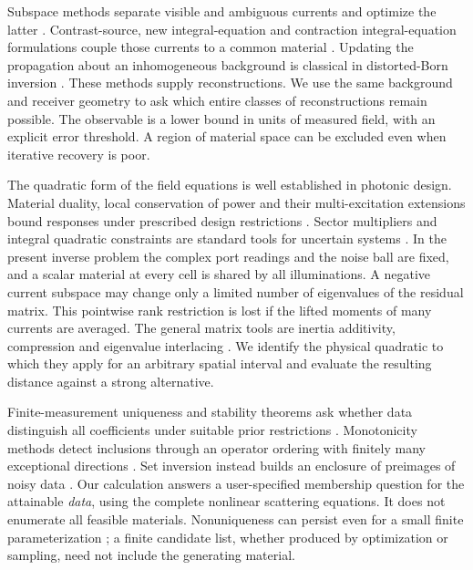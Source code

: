 \documentclass[anonymous,12pt]{iopjournal}
\numberwithin{equation}{section}
\begin{document}
Subspace methods separate visible and ambiguous currents and optimize the latter \cite{chen,zhong,ffttsom}. Contrast-source, new integral-equation and contraction integral-equation formulations couple those currents to a common material \cite{csi,nie,cie,chenbook}. Updating the propagation about an inhomogeneous background is classical in distorted-Born inversion \cite{dbim}. These methods supply reconstructions. We use the same background and receiver geometry to ask which entire classes of reconstructions remain possible. The observable is a lower bound in units of measured field, with an explicit error threshold. A region of material space can be excluded even when iterative recovery is poor.

The quadratic form of the field equations is well established in photonic design. Material duality, local conservation of power and their multi-excitation extensions bound responses under prescribed design restrictions \cite{angeris19,trivedi,angeris,moleskyglobal,moleskylocal,kuang,shim,miller}. Sector multipliers and integral quadratic constraints are standard tools for uncertain systems \cite{iqc,boyd,beck}. In the present inverse problem the complex port readings and the noise ball are fixed, and a scalar material at every cell is shared by all illuminations. A negative current subspace may change only a limited number of eigenvalues of the residual matrix. This pointwise rank restriction is lost if the lifted moments of many currents are averaged. The general matrix tools are inertia additivity, compression and eigenvalue interlacing \cite{haynsworth,tian,fan}. We identify the physical quadratic to which they apply for an arbitrary spatial interval and evaluate the resulting distance against a strong alternative.

Finite-measurement uniqueness and stability theorems ask whether data distinguish all coefficients under suitable prior restrictions \cite{alberti19,alberti21}. Monotonicity methods detect inclusions through an operator ordering with finitely many exceptional directions \cite{griesmaier_harrach,griesmaier_harrach_erratum,albicker}. Set inversion instead builds an enclosure of preimages of noisy data \cite{sivia}. Our calculation answers a user-specified membership question for the attainable \emph{data}, using the complete nonlinear scattering equations. It does not enumerate all feasible materials. Nonuniqueness can persist even for a small finite parameterization \cite{everett96,vasco}; a finite candidate list, whether produced by optimization or sampling, need not include the generating material.
\end{document}
